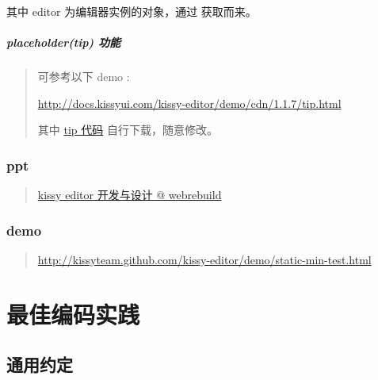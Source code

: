 \documentclass[letterpaper,10pt,english]{sphinxmanual}
\begin{document}
其中 editor 为编辑器实例的对象，通过  获取而来。


\paragraph{placeholder(tip) 功能}
\label{relatedproj/editorguide/faq:placeholder-tip}\begin{quote}

可参考以下 demo  :

\href{http://docs.kissyui.com/kissy-editor/demo/cdn/1.1.7/tip.html}{http://docs.kissyui.com/kissy-editor/demo/cdn/1.1.7/tip.html}

其中 \href{http://docs.kissyui.com/kissy-editor/demo/tip.js}{tip 代码} 自行下载，随意修改。
\end{quote}


\subsection{ppt}
\label{relatedproj/editorguide/index:ppt}\begin{quote}

\href{http://www.slideshare.net/yiminghe/kissy-editor}{kissy editor 开发与设计 @ webrebuild}
\end{quote}


\subsection{demo}
\label{relatedproj/editorguide/index:demo}\begin{quote}

\href{http://kissyteam.github.com/kissy-editor/demo/static-min-test.html}{http://kissyteam.github.com/kissy-editor/demo/static-min-test.html}
\end{quote}


\chapter{最佳编码实践}
\label{styleguide/index:styleguide}\label{styleguide/index::doc}\label{styleguide/index:id1}

\section{通用约定}
\label{styleguide/common-conventions:styleguide-commonconventions}\label{styleguide/common-conventions::doc}\label{styleguide/common-conventions:id1}
\end{document}
